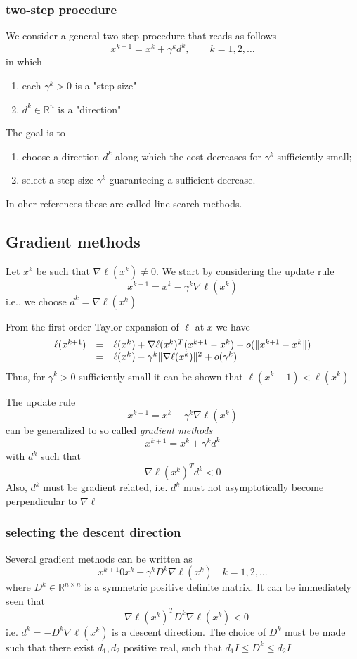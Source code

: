 \documentclass{book}
\newcommand{\R}{\mathbb{R}}
\begin{document}
\subsubsection{two-step procedure}
We consider a general two-step procedure that reads as follows 
\[
    x^{k+1} = x^k+\gamma^k d^k, \qquad k=1,2,\dots
\]
in which 
\begin{enumerate}
    \item each $\gamma^k>0$ is a "step-size" 
    \item $d^k\in\R^n$ is a "direction"
\end{enumerate}
The goal is to 
\begin{enumerate}
    \item choose a direction $d^k$ along which the cost decreases for $\gamma^k$ sufficiently small;
        \item select a step-size $\gamma^k$ guaranteeing a sufficient decrease. 
\end{enumerate}
In oher references these are called line-search methods.
\subsection{Gradient methods}
Let $x^k$ be such that $\nabla\ell(x^k)\neq 0$. We start by considering the update rule 
\[
    x^{k+1} = x^k-\gamma^k\nabla\ell(x^k)
\]
i.e., we choose $d^k = \nabla\ell(x^k)$

From the first order Taylor expansion of $\ell$ at $x$ we have 
\begin{gather*}
    \begin{array}{r c l}
        \ell(x^{k+1}) & = & \ell(x^k)+\nabla\ell(x^k)^T(x^{k+1}-x^k)+o(\|x^{k+1}-x^k\|)\\
                      & = & \ell(x^k)-\gamma^k\|\nabla\ell(x^k)\|^2+o(\gamma^k)
     \end{array}
\end{gather*}
Thus, for $\gamma^k>0$ sufficiently small it can be shown that $\ell(x^k+1)<\ell(x^k)$

The update rule 
\[
    x^{k+1}=x^k-\gamma^k\nabla\ell(x^k)
\]
can be generalized to so called \emph{gradient methods}
\[
    x^{k+1}=x^k+\gamma^kd^k
\]
with $d^k$ such that
\[
    \nabla\ell(x^k)^Td^k<0
\]
Also, $d^k$ must be gradient related, i.e. $d^k$ must not asymptotically become perpendicular to $\nabla\ell$
\subsubsection{selecting the descent direction}
Several gradient methods can be written as 
\[
    x^{k+1} 0 x^k-\gamma^kD^k\nabla\ell(x^k) \quad k=1,2,\dots
\]
where $D^k\in\R^{n\times n}$ is  a symmetric positive definite matrix. It can be immediately seen that 
\[
    -\nabla\ell(x^k)^TD^k\nabla\ell(x^k)<0
\]
i.e. $d^k = -D^k\nabla\ell(x^k)$ is a descent direction. The choice of $D^k$ must be made such that there exist $d_1,d_2$ positive real, such that $d_1 I \leq D^k \leq d_2 I$
\end{document}
